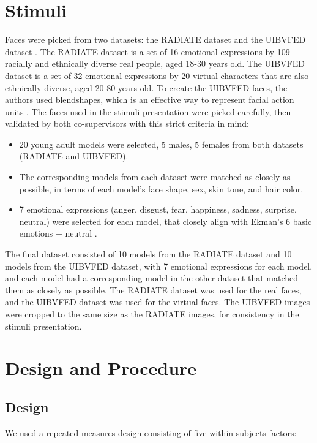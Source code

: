 \section{Stimuli}
Faces were picked from two datasets: the RADIATE dataset \citep{conley_racially_2018} and the UIBVFED dataset \citep{oliver_uibvfed_2020}. 
The RADIATE dataset is a set of 16 emotional expressions by 109 racially and ethnically diverse real people, aged 18-30 years old.
The UIBVFED dataset is a set of 32 emotional expressions by 20 virtual characters that are also ethnically diverse, aged 20-80 years old.
To create the UIBVFED faces, the authors used blendshapes, which is an effective way to represent facial action units \citep{ekman1978facial}. 
The faces used in the stimuli presentation were picked carefully, then validated by both co-supervisors with this strict criteria in mind:
\begin{itemize}
    \item 20 young adult models were selected, 5 males, 5 females from both datasets (RADIATE and UIBVFED). 
    \item The corresponding models from each dataset were matched as closely as possible, in terms of each model's face shape, sex, skin tone, and hair color. 
    \item 7 emotional expressions (anger, disgust, fear, happiness, sadness, surprise, neutral) were selected for each model, that closely align with Ekman's 6 basic emotions + neutral \citep{ekman_are_1992}.
\end{itemize}

The final dataset consisted of 10 models from the RADIATE dataset and 10 models from the UIBVFED dataset, with 7 emotional expressions for each model, and each model had a corresponding model in the other dataset that matched them as closely as possible.
The RADIATE dataset was used for the real faces, and the UIBVFED dataset was used for the virtual faces.
The UIBVFED images were cropped to the same size as the RADIATE images, for consistency in the stimuli presentation.

\section{Design and Procedure}
\subsection{Design}
We used a repeated-measures design consisting of five within-subjects factors:

